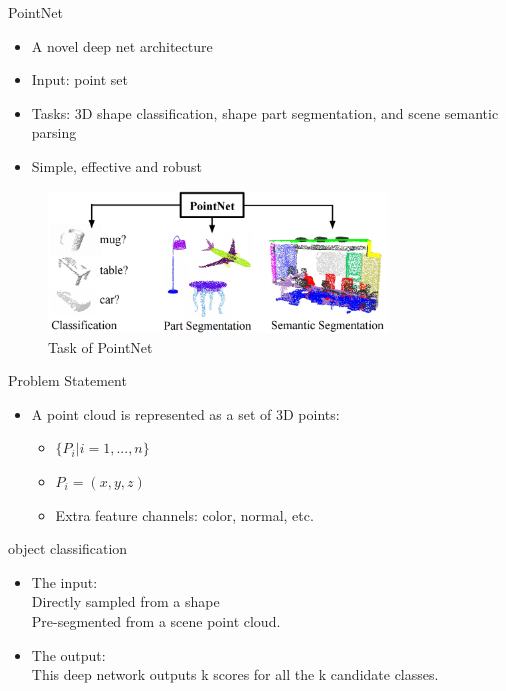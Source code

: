 \documentclass[serif,mathserif]{beamer}
\begin{document}
\begin{frame}{PointNet}
	\begin{itemize}
		\item A novel deep net architecture
		\item Input: point set
		\item Tasks: 3D shape classification, shape part segmentation, and scene semantic parsing 
		\item Simple, effective and robust
	\end{itemize}
	\begin{figure}
		\includegraphics[width=9cm]{image/teaser.png}
		\caption{Task of PointNet}
	\end{figure}
\end{frame}

\begin{frame}{Problem Statement}
	\begin{itemize}
		\item A point cloud is represented as a set of 3D points:  
		\begin{itemize}
			\item $ \{P_i | i = 1,...,n\} $
			\item $ P_i = (x, y, z) $
			\item Extra feature channels: color, normal, etc.
		\end{itemize}
	\end{itemize}
\end{frame}

\begin{frame}{object classification}
	\begin{itemize}
		\item The input: \\
		Directly sampled from a shape \\
		Pre-segmented from a scene point cloud. 
		\item The output: \\
		This deep network outputs k scores for all the k candidate classes.
	\end{itemize}
\end{frame}
\end{document}
